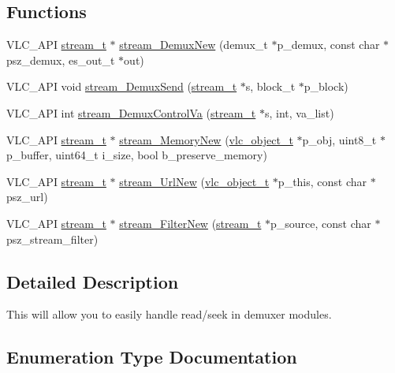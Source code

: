 \subsection*{Functions}
\begin{DoxyCompactItemize}
\item 
V\+L\+C\+\_\+\+A\+PI \hyperlink{structstream__t}{stream\+\_\+t} $\ast$ \hyperlink{group__stream_gaa9684498d9b82c8d7af5ede5a1692a2a}{stream\+\_\+\+Demux\+New} (demux\+\_\+t $\ast$p\+\_\+demux, const char $\ast$psz\+\_\+demux, es\+\_\+out\+\_\+t $\ast$out)
\item 
V\+L\+C\+\_\+\+A\+PI void \hyperlink{group__stream_ga337f45a362c389f9cb7f74fb8c48bee7}{stream\+\_\+\+Demux\+Send} (\hyperlink{structstream__t}{stream\+\_\+t} $\ast$s, block\+\_\+t $\ast$p\+\_\+block)
\item 
V\+L\+C\+\_\+\+A\+PI int \hyperlink{group__stream_ga4fb865659a20694bf5c907cffd97d8ed}{stream\+\_\+\+Demux\+Control\+Va} (\hyperlink{structstream__t}{stream\+\_\+t} $\ast$s, int, va\+\_\+list)
\item 
V\+L\+C\+\_\+\+A\+PI \hyperlink{structstream__t}{stream\+\_\+t} $\ast$ \hyperlink{group__stream_gaeadba02749316baec20ef3f5996b00f7}{stream\+\_\+\+Memory\+New} (\hyperlink{structvlc__object__t}{vlc\+\_\+object\+\_\+t} $\ast$p\+\_\+obj, uint8\+\_\+t $\ast$p\+\_\+buffer, uint64\+\_\+t i\+\_\+size, bool b\+\_\+preserve\+\_\+memory)
\item 
V\+L\+C\+\_\+\+A\+PI \hyperlink{structstream__t}{stream\+\_\+t} $\ast$ \hyperlink{group__stream_gab36b7d73660ca25c2e1505cd5bd33712}{stream\+\_\+\+Url\+New} (\hyperlink{structvlc__object__t}{vlc\+\_\+object\+\_\+t} $\ast$p\+\_\+this, const char $\ast$psz\+\_\+url)
\item 
V\+L\+C\+\_\+\+A\+PI \hyperlink{structstream__t}{stream\+\_\+t} $\ast$ \hyperlink{group__stream_gaa479a3900d7a3ea607d162f41be93d51}{stream\+\_\+\+Filter\+New} (\hyperlink{structstream__t}{stream\+\_\+t} $\ast$p\+\_\+source, const char $\ast$psz\+\_\+stream\+\_\+filter)
\end{DoxyCompactItemize}


\subsection{Detailed Description}
This will allow you to easily handle read/seek in demuxer modules. 

\subsection{Enumeration Type Documentation}
\mbox{\label{group__stream_gac90a8aaf65579464a5604c9de255929a}} 
